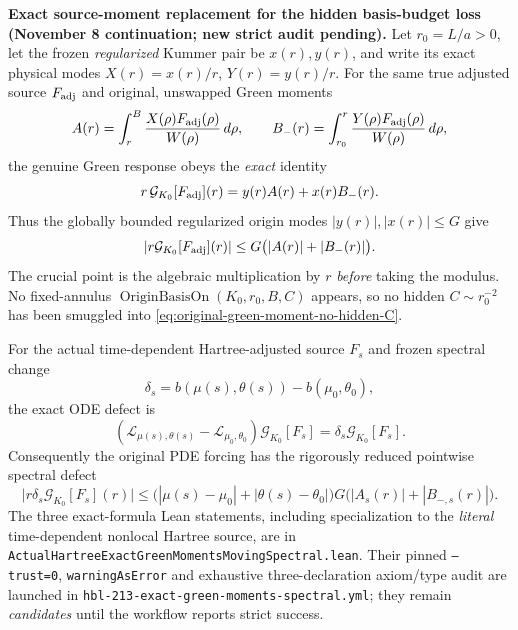 \documentclass[11pt]{amsart}
\begin{document}
\medskip
\noindent\textbf{Exact source-moment replacement for the hidden basis-budget loss
(November 8 continuation; new strict audit pending).}
Let $r_0=L/a>0$, let the frozen \emph{regularized} Kummer pair be
$x(r),y(r)$, and write its exact physical modes
$X(r)=x(r)/r$, $Y(r)=y(r)/r$.  For the same true adjusted source
$F_{\rm adj}$ and original, unswapped Green moments
\[
 A(r)=\int_r^B\frac{X(\rho)F_{\rm adj}(\rho)}{W(\rho)}\,d\rho,
 \qquad
 B_-(r)=\int_{r_0}^r\frac{Y(\rho)F_{\rm adj}(\rho)}{W(\rho)}\,d\rho,
\]
the genuine Green response obeys the \emph{exact} identity
\begin{equation}
 r\,\mathcal G_{K_0}[F_{\rm adj}](r)
       =y(r)A(r)+x(r)B_-(r).
 \label{eq:exact-original-green-weighted-moments}
\end{equation}
Thus the globally bounded regularized origin modes
$\lvert y(r)\rvert,\lvert x(r)\rvert\le G$ give
\begin{equation}
 \lvert r\mathcal G_{K_0}[F_{\rm adj}](r)\rvert
 \le G\bigl(\lvert A(r)\rvert+\lvert B_-(r)\rvert\bigr).
 \label{eq:original-green-moment-no-hidden-C}
\end{equation}
The crucial point is the algebraic multiplication by $r$
\emph{before} taking the modulus.  No fixed-annulus
$\operatorname{OriginBasisOn}(K_0,r_0,B,C)$ appears, so no hidden
$C\sim r_0^{-2}$ has been smuggled into
\eqref{eq:original-green-moment-no-hidden-C}.

For the actual time-dependent Hartree-adjusted source
$F_s$ and frozen spectral change
\[
 \delta_s=b(\mu(s),\theta(s))-b(\mu_0,\theta_0),
\]
the exact ODE defect is
\[
 (\mathcal L_{\mu(s),\theta(s)}-\mathcal L_{\mu_0,\theta_0})
 \mathcal G_{K_0}[F_s]
      =\delta_s\mathcal G_{K_0}[F_s].
\]
Consequently the original PDE forcing has the rigorously reduced
pointwise spectral defect
\begin{equation}
 \bigl|r\delta_s\mathcal G_{K_0}[F_s](r)\bigr|
 \le
 \bigl(|\mu(s)-\mu_0|+|\theta(s)-\theta_0|\bigr)
 G\bigl(|A_s(r)|+|B_{-,s}(r)|\bigr).
 \label{eq:original-hartree-moving-moment-defect}
\end{equation}
The three exact-formula Lean statements, including specialization
to the \emph{literal} time-dependent nonlocal Hartree source,
are in \texttt{ActualHartreeExactGreenMomentsMovingSpectral.lean}.
Their pinned \texttt{--trust=0}, \texttt{warningAsError} and exhaustive
three-declaration axiom/type audit are launched in
\texttt{hbl-213-exact-green-moments-spectral.yml}; they remain
\emph{candidates} until the workflow reports strict success.
\end{document}

